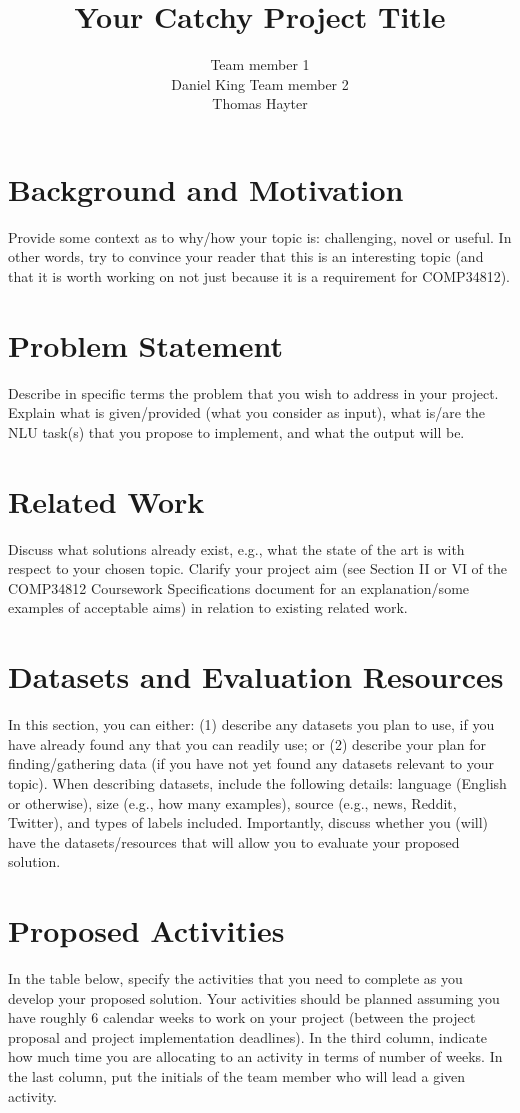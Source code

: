\documentclass[11pt]{article}
\title{Your Catchy Project Title}
\author{
    Team member 1 \\
    Daniel King
    \And
    Team member 2 \\
    Thomas Hayter
}
\begin{document}
\maketitle


\section{Background and Motivation}

Provide some context as to why/how your topic is: challenging, novel or useful. In other words, try to convince your reader that this is an interesting topic (and that it is worth working on not just because it is a requirement for COMP34812).

\section{Problem Statement}
Describe in specific terms the problem that you wish to address in your project. Explain what is given/provided (what you consider as input), what is/are the NLU task(s) that you propose to implement, and what the output will be. 

\section{Related Work}
Discuss what solutions already exist, e.g., what the state of the art is with respect to your chosen topic. Clarify your project aim (see Section II or VI of the COMP34812 Coursework Specifications document for an explanation/some examples of acceptable aims) in relation to existing related work.

\section{Datasets and Evaluation Resources }
In this section, you can either: (1) describe any datasets you plan to use, if you have already found any that you can readily use; or (2) describe your plan for finding/gathering data (if you have not yet found any datasets relevant to your topic). When describing datasets, include the following details: language (English or otherwise), size (e.g., how many examples), source (e.g., news, Reddit, Twitter), and types of labels included. Importantly, discuss whether you (will) have the datasets/resources that will allow you to evaluate your proposed solution. 



\section{Proposed Activities}
In the table below, specify the activities that you need to complete as you develop your proposed solution. Your activities should be planned assuming you have roughly 6 calendar weeks to work on your project (between the project proposal and project implementation deadlines). In the third column, indicate how much time you are allocating to an activity in terms of number of weeks. In the last column, put the initials of the team member who will lead a given activity.
\end{document}
